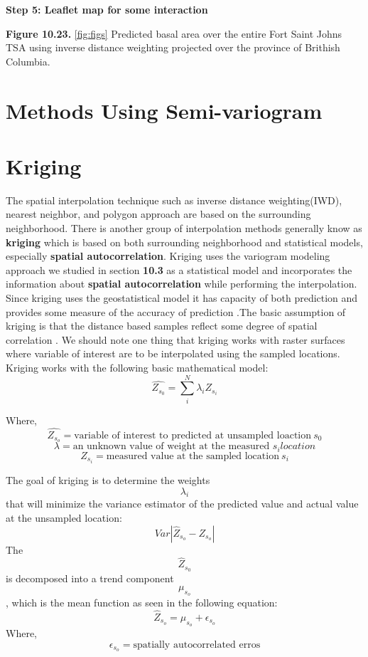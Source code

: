 \documentclass[
]{book}
\begin{document}
\textbf{Step 5: Leaflet map for some interaction}

\textbf{Figure 10.23.} \ref{fig:figs} Predicted basal area over the entire Fort Saint Johns TSA using inverse distance weighting projected over the province of Brithish Columbia.

\hypertarget{methods-using-semi-variogram}{%
\section{Methods Using Semi-variogram}\label{methods-using-semi-variogram}}

\hypertarget{kriging}{%
\section{Kriging}\label{kriging}}

The spatial interpolation technique such as inverse distance weighting(IWD), nearest neighbor, and polygon approach are based on the surrounding neighborhood. There is another group of interpolation methods generally know as \textbf{kriging} \citep{Krige1951} which is based on both surrounding neighborhood and statistical models, especially \textbf{spatial autocorrelation}. Kriging uses the variogram modeling approach we studied in section \textbf{10.3} as a statistical model and incorporates the information about \textbf{spatial autocorrelation} while performing the interpolation. Since kriging uses the geostatistical model it has capacity of both prediction and provides some measure of the accuracy of prediction \citep{Goovaerts2008}.The basic assumption of kriging is that the distance based samples reflect some degree of spatial correlation \citep{Goovaerts2008}. We should note one thing that kriging works with raster surfaces where variable of interest are to be interpolated using the sampled locations. Kriging works with the following basic mathematical model:
\[\hat{Z_{s_0}}=\sum_{i}^N \lambda_{i}Z_{s_i}\]

Where, \[\hat{Z_{s_o}}=\text{variable of interest to predicted at unsampled loaction}\ s_0 \]
\[ \lambda=\text{an unknown value of weight at the measured } s_{i} location\]
\[Z_{s_i}=\text{measured value at the sampled location} \ s_i\]

The goal of kriging is to determine the weights \[\lambda_i\] that will minimize the variance estimator of the predicted value and actual value at the unsampled location:
\[ Var|\hat{Z}_{s_o}-Z_{s_o}|\]
The \[\hat{Z}_{s_0}\] is decomposed into a trend component \[\mu_{s_o}\], which is the mean function as seen in the following equation:
\[\hat{Z}_{s_o} = \mu_{s_o} + \epsilon_{s_o}\]
Where,\\
\[\epsilon_{s_o} = \text{spatially autocorrelated erros}\]
\end{document}

